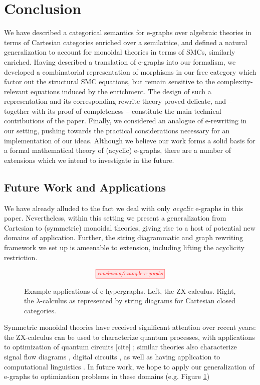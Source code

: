 

\section{Conclusion}

We have described a categorical semantics for e-graphs over algebraic theories in terms of Cartesian categories enriched over a semilattice, and defined a natural generalization to account for monoidal theories in terms of SMCs,  similarly enriched.  Having described a translation of e-graphs into our formalism, we developed a combinatorial representation of morphisms in our free category which factor out the structural SMC equations, but remain sensitive to the complexity-relevant equations induced by the enrichment.  The design of such a representation and its corresponding  rewrite theory proved delicate, and -- together with its proof of completeness -- constitute the main technical contributions of the paper.  Finally, we considered an analogue of e-rewriting in our setting, pushing towards the practical considerations necessary for an implementation of our ideas.  Although we believe our work forms a solid basis for a formal mathematical theory of (acyclic) e-graphs,  there are a number of extensions which we intend to investigate in the future.

\subsection{Future Work and Applications}

We have already alluded to the fact we deal with only \textit{acyclic} e-graphs in this paper.  Nevertheless,  within this setting we present a generalization from Cartesian to (symmetric) monoidal theories,  giving rise to a host of potential new domains of application.  Further,  the string diagrammatic and graph rewriting framework we set up is ameenable to extension, including lifting the acyclicity restriction. 

\begin{figure}\label{fig:applications}
\[
	\scalebox{0.75}{
	\tikzfig{conclusion/example-e-graphs}
	}
\]
\caption{Example applications of e-hypergraphs.  Left, the ZX-calculus.  Right, the $\lambda$-calculus as represented by string diagrams for Cartesian closed categories.  }
\end{figure}

Symmetric monoidal theories have received significant attention over recent years: the ZX-calculus can be used to characterize quantum processes, with applications to optimization of quantum circuits [cite] ; similar theories also characterize signal flow diagrams 
\cite{baldan_categorical_2014}, digital circuits 
\cite{ghica_operational_2021}, as well as having application to computational linguistics \cite{wazni_quantum_2022,coecke_lambek_2013}.  In future work, we hope to apply our generalization of e-graphs to optimization problems in these domains (e.g. Figure \ref{fig:applications})

